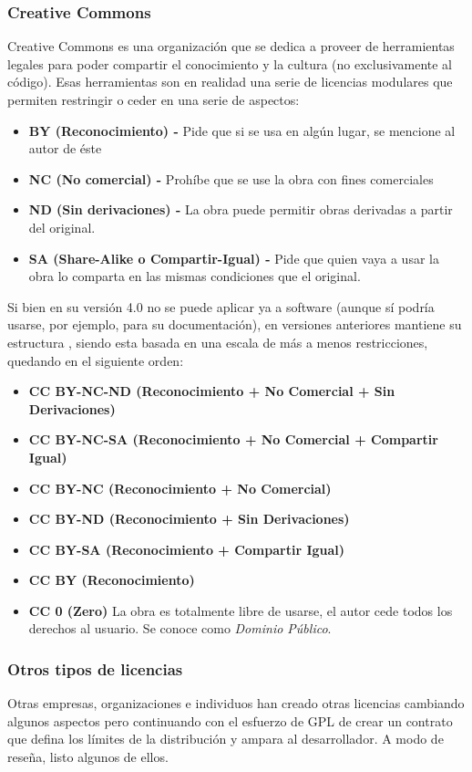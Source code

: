 \subsubsection{Creative Commons}
Creative Commons \cite{cc-about} es una organización que se dedica a proveer de herramientas legales para poder compartir el conocimiento y la cultura (no exclusivamente al código). Esas herramientas son en realidad una serie de licencias modulares que permiten restringir o ceder en una serie de aspectos:

\begin{itemize}
	\item \textbf{BY (Reconocimiento) - } Pide que si se usa en algún lugar, se mencione al autor de éste
	\item \textbf{NC (No comercial) - } Prohíbe que se use la obra con fines comerciales
	\item \textbf{ND (Sin derivaciones) - } La obra puede permitir obras derivadas a partir del original.
	\item \textbf{SA (Share-Alike o Compartir-Igual) - } Pide que quien vaya a usar la obra lo comparta en las mismas condiciones que el original.
\end{itemize}

Si bien en su versión 4.0 no se puede aplicar ya a software (aunque sí podría usarse, por ejemplo, para su documentación), en versiones anteriores mantiene su estructura \cite{cc-licenses}, siendo esta basada en una escala de más a menos restricciones, quedando en el siguiente orden:

\begin{itemize}
	\item \textbf{CC BY-NC-ND (Reconocimiento + No Comercial + Sin Derivaciones)}
	\item \textbf{CC BY-NC-SA (Reconocimiento + No Comercial + Compartir Igual)}
	\item \textbf{CC BY-NC (Reconocimiento + No Comercial)}
	\item \textbf{CC BY-ND (Reconocimiento + Sin Derivaciones)}
	\item \textbf{CC BY-SA (Reconocimiento + Compartir Igual)}
	\item \textbf{CC BY (Reconocimiento)}
	\item \textbf{CC 0 (Zero)} La obra es totalmente libre de usarse, el autor cede todos los derechos al usuario. Se conoce como \textit{Dominio Público}.
\end{itemize}

\subsubsection{Otros tipos de licencias}
Otras empresas, organizaciones e individuos han creado otras licencias cambiando algunos aspectos pero continuando con el esfuerzo de GPL de crear un contrato que defina los límites de la distribución y ampara al desarrollador. A modo de reseña, listo algunos de ellos.

